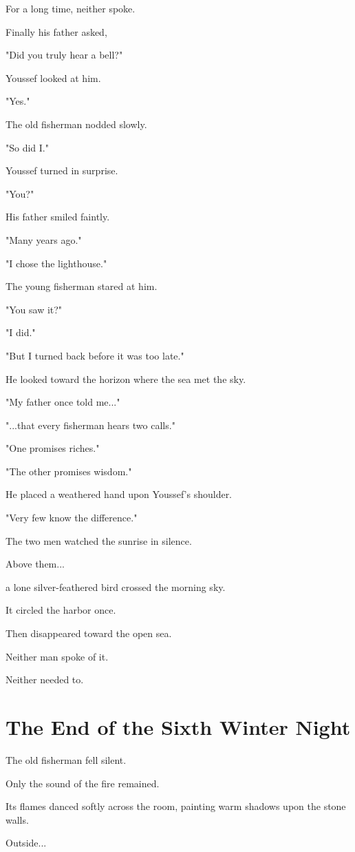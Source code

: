 \documentclass[12pt,openany]{book}
\begin{document}
For a long time, neither spoke.

Finally his father asked,

"Did you truly hear a bell?"

Youssef looked at him.

"Yes."

The old fisherman nodded slowly.

"So did I."

Youssef turned in surprise.

"You?"

His father smiled faintly.

"Many years ago."

"I chose the lighthouse."

The young fisherman stared at him.

"You saw it?"

"I did."

"But I turned back before it was too late."

He looked toward the horizon where the sea met the sky.

"My father once told me..."

"...that every fisherman hears two calls."

"One promises riches."

"The other promises wisdom."

He placed a weathered hand upon Youssef's shoulder.

"Very few know the difference."

The two men watched the sunrise in silence.

Above them...

a lone silver-feathered bird crossed the morning sky.

It circled the harbor once.

Then disappeared toward the open sea.

Neither man spoke of it.

Neither needed to.
\section*{The End of the Sixth Winter Night}

The old fisherman fell silent.

Only the sound of the fire remained.

Its flames danced softly across the room, painting warm shadows upon the stone walls.

Outside...
\end{document}
